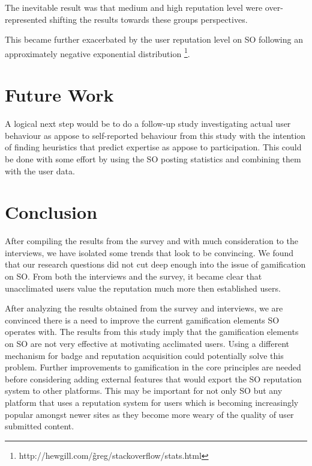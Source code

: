 \documentclass{sigchi}
\begin{document}
The inevitable result was that medium and high reputation level were over-represented shifting the results towards these groups perspectives.

This became further exacerbated by the user reputation level on SO following an approximately negative exponential distribution \footnote{http://hewgill.com/\~greg/stackoverflow/stats.html}. 



\section{Future Work}

A logical next step would be to do a follow-up study investigating actual user behaviour as appose to self-reported behaviour from this study with the intention of finding heuristics that predict expertise as appose to participation. This could be done with some effort by using the SO posting statistics and combining them with the user data.


\section{Conclusion}

After compiling the results from the survey and with much consideration to the interviews, we have isolated some trends that look to be convincing. We found that our research questions did not cut deep enough into the issue of gamification on SO. From both the interviews and the survey, it became clear that unacclimated users value the reputation much more then established users.

After analyzing the results obtained from the survey and interviews, we are convinced there is a need to improve the current gamification elements SO operates with. The results from this study imply that the gamification elements on SO are not very effective at motivating acclimated users. Using a different mechanism for badge and reputation acquisition could potentially solve this problem. Further improvements to gamification in the core principles are needed before considering adding external features that would export the SO reputation system to other platforms. This may be important for not only SO but any platform that uses a reputation system for users which is becoming increasingly popular amongst newer sites as they become more weary of the quality of user submitted content.
\end{document}
